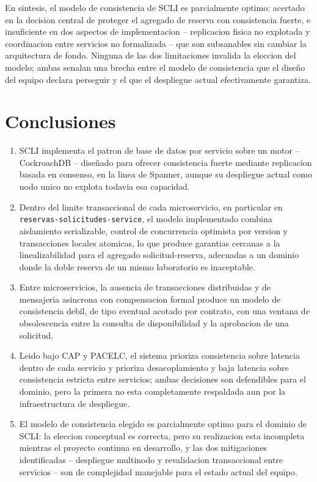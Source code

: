 \documentclass[11pt,a4paper]{article}
\begin{document}
En sintesis, el modelo de consistencia de SCLI es parcialmente optimo: acertado en la decision central de proteger el agregado de reserva con consistencia fuerte, e insuficiente en dos aspectos de implementacion -- replicacion fisica no explotada y coordinacion entre servicios no formalizada -- que son subsanables sin cambiar la arquitectura de fondo. Ninguna de las dos limitaciones invalida la eleccion del modelo; ambas senalan una brecha entre el modelo de consistencia que el diseño del equipo declara perseguir y el que el despliegue actual efectivamente garantiza.

\section{Conclusiones}

\begin{enumerate}[label=\arabic*.]
\item SCLI implementa el patron de base de datos por servicio sobre un motor -- CockroachDB -- diseñado para ofrecer consistencia fuerte mediante replicacion basada en consenso, en la linea de Spanner, aunque su despliegue actual como nodo unico no explota todavia esa capacidad.

\item Dentro del limite transaccional de cada microservicio, en particular en \texttt{reservas-solicitudes-service}, el modelo implementado combina aislamiento serializable, control de concurrencia optimista por version y transacciones locales atomicas, lo que produce garantias cercanas a la linealizabilidad para el agregado solicitud-reserva, adecuadas a un dominio donde la doble reserva de un mismo laboratorio es inaceptable.

\item Entre microservicios, la ausencia de transacciones distribuidas y de mensajeria asincrona con compensacion formal produce un modelo de consistencia debil, de tipo eventual acotado por contrato, con una ventana de obsolescencia entre la consulta de disponibilidad y la aprobacion de una solicitud.

\item Leido bajo CAP y PACELC, el sistema prioriza consistencia sobre latencia dentro de cada servicio y prioriza desacoplamiento y baja latencia sobre consistencia estricta entre servicios; ambas decisiones son defendibles para el dominio, pero la primera no esta completamente respaldada aun por la infraestructura de despliegue.

\item El modelo de consistencia elegido es parcialmente optimo para el dominio de SCLI: la eleccion conceptual es correcta, pero su realizacion esta incompleta mientras el proyecto continua en desarrollo, y las dos mitigaciones identificadas -- despliegue multinodo y revalidacion transaccional entre servicios -- son de complejidad manejable para el estado actual del equipo.
\end{enumerate}
\end{document}

